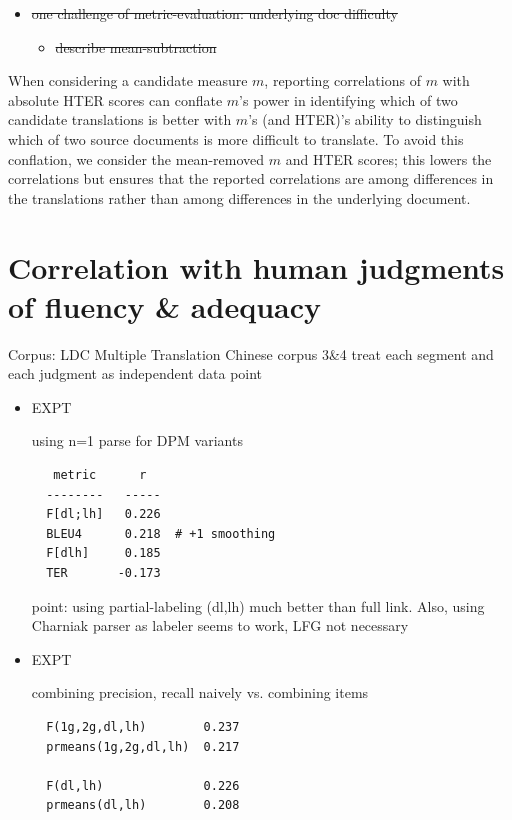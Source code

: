 \documentclass{kluwer}    %
\begin{document}
\begin{article}
\begin{itemize}
\begin{itemize}
\item \sout{one challenge of metric-evaluation: underlying doc difficulty }
  \begin{itemize}
  \item \sout{describe mean-subtraction}
  \end{itemize}
\end{itemize}
When considering a candidate measure $m$, reporting correlations of
$m$ with absolute HTER scores can conflate $m$'s power in identifying
which of two candidate translations is better with $m$'s (and HTER)'s
ability to distinguish which of two source documents is more difficult
to translate. To avoid this conflation, we consider the mean-removed
$m$ and HTER scores; this lowers the correlations but ensures that the
reported correlations are among differences in the translations rather
than among differences in the underlying document.

\end{itemize}

\section{Correlation with human judgments of fluency \& adequacy}
\label{sec:faexpts}
Corpus: LDC Multiple Translation Chinese corpus 3\&4 treat each
segment and each judgment as independent data point

\begin{itemize}
\item EXPT

  using n=1 parse for DPM variants

\begin{verbatim}
   metric      r
  --------   -----
  F[dl;lh]   0.226
  BLEU4      0.218  # +1 smoothing
  F[dlh]     0.185
  TER       -0.173
\end{verbatim}

  point: using partial-labeling (dl,lh) much better than full
  link. Also, using Charniak parser as labeler seems to work, LFG not
  necessary

\item EXPT 

  combining precision, recall naively vs. combining items

\begin{verbatim}
  F(1g,2g,dl,lh)        0.237
  prmeans(1g,2g,dl,lh)  0.217

  F(dl,lh)              0.226
  prmeans(dl,lh)        0.208
\end{verbatim}


\end{itemize}
\end{article}
\end{document}
